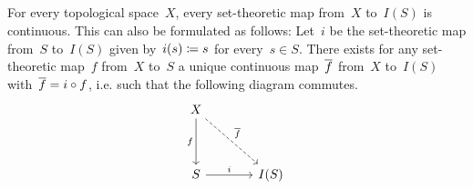 \subsection{}

For every topological space~$X$, every set-theoretic map from~$X$ to~$I(S)$ is continuous.
This can also be formulated as follows:
Let~$i$ be the set-theoretic map from~$S$ to~$I(S)$ given by~$i(s) \coloneqq s$ for every~$s \in S$.
There exists for any set-theoretic map~$f$ from~$X$ to~$S$ a unique continuous map~$\overline{f}$ from~$X$ to~$I(S)$ with~$\overline{f} = i \circ f$, i.e. such that the following diagram commutes.
\[
	\begin{tikzcd}[column sep = large, row sep = huge]
		X
		\arrow{d}[left]{f}
		\arrow[dashed]{dr}[above right]{\induced{f}}
		&
		{}
		\\
		S
		\arrow{r}[above]{i}
		&
		I(S)
	\end{tikzcd}
\]
